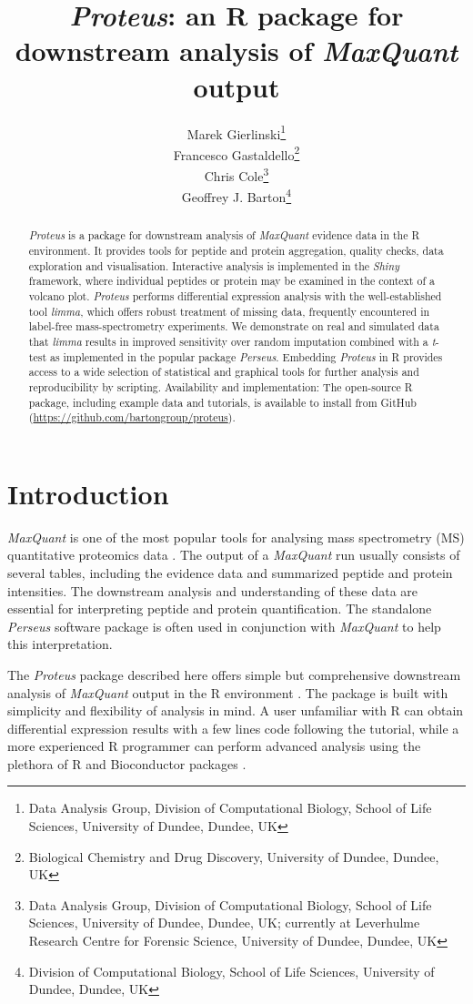 \documentclass[]{article}
\title{\emph{Proteus}: an R package for downstream analysis of \emph{MaxQuant}
output}
\author{Marek Gierlinski\footnote{Data Analysis Group, Division of Computational
  Biology, School of Life Sciences, University of Dundee, Dundee, UK} \\ Francesco Gastaldello\footnote{Biological Chemistry and Drug Discovery,
  University of Dundee, Dundee, UK} \\ Chris Cole\footnote{Data Analysis Group, Division of Computational
  Biology, School of Life Sciences, University of Dundee, Dundee, UK;
  currently at Leverhulme Research Centre for Forensic Science,
  University of Dundee, Dundee, UK} \\ Geoffrey J. Barton\footnote{Division of Computational Biology, School of
  Life Sciences, University of Dundee, Dundee, UK}}
\date{}
\begin{document}
\maketitle
\begin{abstract}
\emph{Proteus} is a package for downstream analysis of \emph{MaxQuant}
evidence data in the R environment. It provides tools for peptide and
protein aggregation, quality checks, data exploration and visualisation.
Interactive analysis is implemented in the \emph{Shiny} framework, where
individual peptides or protein may be examined in the context of a
volcano plot. \emph{Proteus} performs differential expression analysis
with the well-established tool \emph{limma}, which offers robust
treatment of missing data, frequently encountered in label-free
mass-spectrometry experiments. We demonstrate on real and simulated data
that \emph{limma} results in improved sensitivity over random imputation
combined with a \emph{t}-test as implemented in the popular package
\emph{Perseus}. Embedding \emph{Proteus} in R provides access to a wide
selection of statistical and graphical tools for further analysis and
reproducibility by scripting. Availability and implementation: The
open-source R package, including example data and tutorials, is
available to install from GitHub
(\url{https://github.com/bartongroup/proteus}).
\end{abstract}

\section{Introduction}\label{introduction}

\emph{MaxQuant} is one of the most popular tools for analysing mass
spectrometry (MS) quantitative proteomics data \citep{coxmann2008}. The
output of a \emph{MaxQuant} run usually consists of several tables,
including the evidence data and summarized peptide and protein
intensities. The downstream analysis and understanding of these data are
essential for interpreting peptide and protein quantification. The
standalone \emph{Perseus} software package \citep{tyanova2016} is often
used in conjunction with \emph{MaxQuant} to help this interpretation.

The \emph{Proteus} package described here offers simple but
comprehensive downstream analysis of \emph{MaxQuant} output in the R
environment \citep{R2018}. The package is built with simplicity and
flexibility of analysis in mind. A user unfamiliar with R can obtain
differential expression results with a few lines code following the
tutorial, while a more experienced R programmer can perform advanced
analysis using the plethora of R and Bioconductor packages
\citep{bioconductor2015}.
\end{document}
